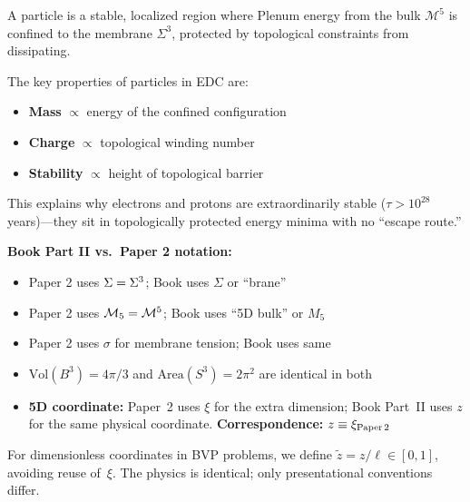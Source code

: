 \begin{definition}[Particle]
\label{def:ch2_particle}
A particle is a stable, localized region where Plenum energy from the bulk $\mathcal{M}^5$
is confined to the membrane $\Sigma^3$, protected by topological constraints from dissipating.
\end{definition}

The key properties of particles in EDC are:
\begin{itemize}
    \item \textbf{Mass} $\propto$ energy of the confined configuration
    \item \textbf{Charge} $\propto$ topological winding number
    \item \textbf{Stability} $\propto$ height of topological barrier
\end{itemize}

This explains why electrons and protons are extraordinarily stable ($\tau > 10^{28}$ years)---they
sit in topologically protected energy minima with no ``escape route.''

\begin{tcolorbox}[colback=cyan!5!white, colframe=cyan!50!black,
    title=\textbf{Notation Bridge}]
\textbf{Book Part II vs.\ Paper 2 notation:}
\begin{itemize}[nosep]
    \item Paper 2 uses $\Sigma = \Sigma^3$; Book uses $\Sigma$ or ``brane''
    \item Paper 2 uses $\mathcal{M}_5 = \mathcal{M}^5$; Book uses ``5D bulk'' or $M_5$
    \item Paper 2 uses $\sigma$ for membrane tension; Book uses same
    \item $\text{Vol}(B^3) = 4\pi/3$ and $\text{Area}(S^3) = 2\pi^2$ are identical in both
    \item \textbf{5D coordinate:} Paper~2 uses $\xi$ for the extra dimension;
          Book Part~II uses $z$ for the same physical coordinate.
          \textbf{Correspondence:} $z \equiv \xi_{\text{Paper\,2}}$
\end{itemize}
For dimensionless coordinates in BVP problems, we define $\tilde{z} = z/\ell \in [0,1]$,
avoiding reuse of~$\xi$.
The physics is identical; only presentational conventions differ.
\end{tcolorbox}


